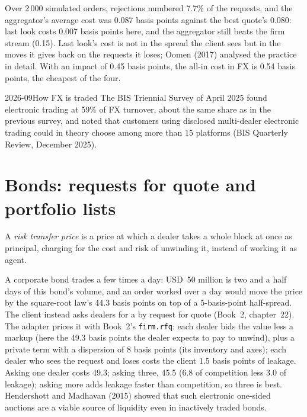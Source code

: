 \label{lst:mx:execution-beyond-equities:fx}

Over 2\,000 simulated orders, rejections numbered 7.7\% of the requests, and the aggregator's average cost was 0.087 basis points against the best
quote's 0.080: last look costs 0.007 basis points here, and the aggregator still beats the firm stream (0.15). Last look's cost is not in the spread
the client sees but in the moves it gives back on the requests it loses; Oomen (2017) analysed the practice in detail. With an impact of 0.45 basis
points, the all-in cost in FX is 0.54 basis points, the cheapest of the four.

\begin{dated}{2026-09}{How FX is traded}\label{dat:mx:execution-beyond-equities:bis}
The BIS Triennial Survey of April 2025 found electronic trading at 59\% of FX turnover, about the same share as in the previous survey, and noted that
customers using disclosed multi-dealer electronic trading could in theory choose among more than 15 platforms (BIS Quarterly Review, December 2025).
\end{dated}

\section{Bonds: requests for quote and portfolio lists}

\begin{definition}\label{def:mx:execution-beyond-equities:rtp}
A \emph{risk transfer price} is a price at which a dealer takes a whole block at once as principal, charging for the cost and
risk of unwinding it, instead of working it as agent.
\end{definition}

A corporate bond trades a few times a day: USD~50 million is two and a half days of this bond's volume, and an order worked over a day would move the
price by the square-root law's 44.3 basis points on top of a 5-basis-point half-spread. The client instead asks dealers for a  by
request for quote (Book~2, chapter~22). The adapter prices it with Book~2's \texttt{firm.rfq}: each dealer bids the value less a markup (here the
49.3 basis points the dealer expects to pay to unwind), plus a private term with a dispersion of 8 basis points (its inventory and axes); each dealer who
sees the request and loses costs the client 1.5 basis points of leakage. Asking one dealer costs 49.3; asking three, 45.5 (6.8 of competition less 3.0
of leakage); asking more adds leakage faster than competition, so three is best. Hendershott and Madhavan (2015) showed that such electronic
one-sided auctions are a viable source of liquidity even in inactively traded bonds.

